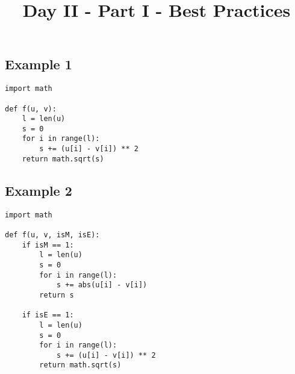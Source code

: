 \documentclass{article}
\title{Day II - Part I - Best Practices}
\date{}
\begin{document}
\maketitle

\subsection*{Example 1}
\begin{verbatim}
import math

def f(u, v):
    l = len(u)
    s = 0
    for i in range(l):
        s += (u[i] - v[i]) ** 2
    return math.sqrt(s)
\end{verbatim}

\newpage
\subsection*{Example 2}
\begin{verbatim}
import math 

def f(u, v, isM, isE):
    if isM == 1:
        l = len(u)
        s = 0
        for i in range(l):
            s += abs(u[i] - v[i])
        return s
    
    if isE == 1:
        l = len(u)
        s = 0
        for i in range(l):
            s += (u[i] - v[i]) ** 2
        return math.sqrt(s)
\end{verbatim}
\end{document}
